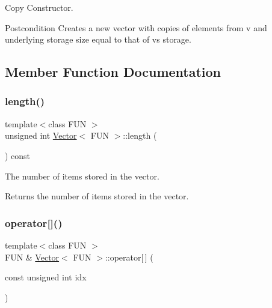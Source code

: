 Copy Constructor. 

\begin{DoxyPostcond}{Postcondition}
Creates a new vector with copies of elements from v and underlying storage size equal to that of v\textquotesingle{}s storage. 
\end{DoxyPostcond}


\subsection{Member Function Documentation}
\mbox{\label{classVector_ab89f11fa1d0aadc25484f4971f16f38a}} 
\subsubsection{\texorpdfstring{length()}{length()}}
{\footnotesize\ttfamily template$<$class F\+UN $>$ \\
unsigned int \hyperlink{classVector}{Vector}$<$ F\+UN $>$\+::length (\begin{DoxyParamCaption}{ }\end{DoxyParamCaption}) const}



The number of items stored in the vector. 

\begin{DoxyReturn}{Returns}
the number of items stored in the vector. 
\end{DoxyReturn}
\mbox{\label{classVector_a4c61dff267d82d1e33aebded9d40e489}} 
\subsubsection{\texorpdfstring{operator[]()}{operator[]()}\hspace{0.1cm}{\footnotesize\ttfamily [1/2]}}
{\footnotesize\ttfamily template$<$class F\+UN $>$ \\
F\+UN \& \hyperlink{classVector}{Vector}$<$ F\+UN $>$\+::operator\mbox{[}$\,$\mbox{]} (\begin{DoxyParamCaption}\item[{const unsigned int}]{idx }\end{DoxyParamCaption})}



